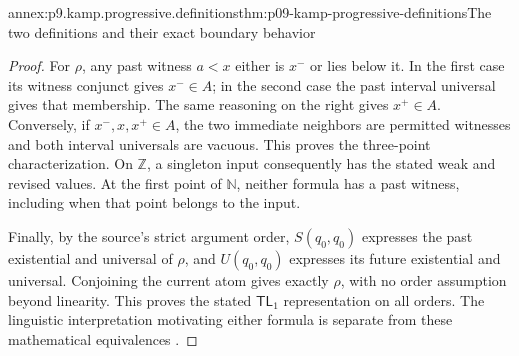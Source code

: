 \begin{annexitem}{annex:p9.kamp.progressive.definitions}{thm:p09-kamp-progressive-definitions}{The two definitions and their exact boundary behavior}
\begin{proof}
For \(\rho\), any past witness \(a<x\) either is
\(x^-\) or lies below it. In the first case its witness
conjunct gives \(x^-\in A\); in the second case the
past interval universal gives that membership. The same
reasoning on the right gives \(x^+\in A\). Conversely,
if \(x^-,x,x^+\in A\), the two immediate neighbors
are permitted witnesses and both interval universals
are vacuous. This proves the three-point characterization.
On \(\mathbb Z\), a singleton input consequently has
the stated weak and revised values. At the first point
of \(\mathbb N\), neither formula has a past witness,
including when that point belongs to the input.

Finally, by the source's strict argument order,
\(S(q_0,q_0)\) expresses the past existential and
universal of \(\rho\), and \(U(q_0,q_0)\) expresses
its future existential and universal. Conjoining the
current atom gives exactly \(\rho\), with no order
assumption beyond linearity. This proves the stated
\(\mathsf{TL}_1\) representation on all orders.
The linguistic interpretation motivating either formula
is separate from these mathematical equivalences
\cite[pp.~19, 112--113]{Kamp1968}.
\end{proof}
\end{annexitem}

